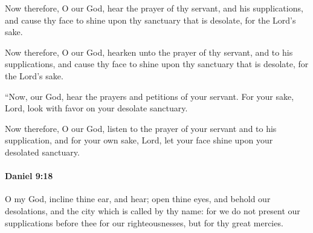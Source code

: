 			Now therefore, O our God, hear the prayer of thy servant, and his supplications, and cause thy face to shine upon thy sanctuary that is desolate, for the Lord’s sake.

			\begin{versebox}
					\item[BHS] 
					\item[LXX] 
					\item[ASV] Now therefore, O our God, hearken unto the prayer of thy servant, and to his supplications, and cause thy face to shine upon thy sanctuary that is desolate, for the Lord's sake.
					\item[NIV] “Now, our God, hear the prayers and petitions of your servant. For your sake, Lord, look with favor on your desolate sanctuary.
					\item[NRSV] Now therefore, O our God, listen to the prayer of your servant and to his supplication, and for your own sake, Lord, let your face shine upon your desolated sanctuary.
			\end{versebox}

		\paragraph{Daniel 9:18} %
			\label{DANIEL-9-18}

			O my God, incline thine ear, and hear; open thine eyes, and behold our desolations, and the city which is called by thy name: for we do not present our supplications before thee for our righteousnesses, but for thy great mercies.

